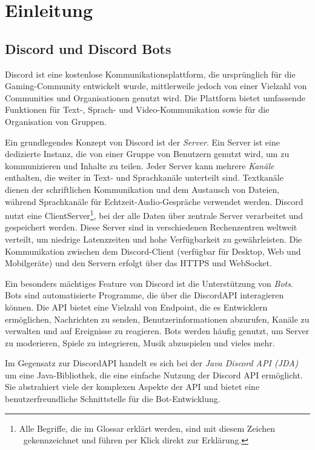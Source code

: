 
\section{Einleitung}\label{einleitung}

\subsection{Discord und Discord Bots}\label{discord-und-discord-bots}
Discord ist eine kostenlose Kommunikationsplattform, die ursprünglich für die Gaming-Com\-mu\-ni\-ty entwickelt wurde, mittlerweile jedoch von einer Vielzahl von Communities und Organisationen genutzt wird. Die Plattform bietet umfassende Funktionen für Text-, Sprach- und Video-Kommunikation sowie für die Organisation von Gruppen.

Ein grundlegendes Konzept von Discord ist der \emph{Server}. Ein Server ist eine dedizierte Instanz, die von einer Gruppe von Benutzern genutzt wird, um zu kommunizieren und Inhalte zu teilen. Jeder Server kann mehrere \emph{Kanäle} enthalten, die weiter in Text- und Sprachkanäle unterteilt sind. Textkanäle dienen der schriftlichen Kommunikation und dem Austausch von Dateien, während Sprachkanäle für Echtzeit-Audio-Gespräche verwendet werden.\autocite{discord-guide} Discord nutzt eine \gls{ClientServer}\footnote{Alle Begriffe, die im Glossar erklärt werden, sind mit diesem Zeichen \large\adfrightarrowhead\footnotesize\ gekennzeichnet und führen per Klick direkt zur Erklärung.}, bei der alle Daten über zentrale Server verarbeitet und gespeichert werden. Diese Server sind in verschiedenen Rechenzentren weltweit verteilt, um niedrige Latenzzeiten und hohe Verfügbarkeit zu gewährleisten. Die Kommunikation zwischen dem Discord-Client (verfügbar für Desktop, Web und Mobilgeräte) und den Servern erfolgt über das \gls{HTTPS} und \gls{WebSocket}.\autocite{discord-developer}

Ein besonders mächtiges Feature von Discord ist die Unterstützung von \emph{Bots}. Bots sind automatisierte Programme, die über die \gls{DiscordAPI} interagieren können. Die API bietet eine Vielzahl von \gls{Endpoint}, die es Entwicklern ermöglichen, Nachrichten zu senden, Benutzerinformationen abzurufen, Kanäle zu verwalten und auf Ereignisse zu reagieren. Bots werden häufig genutzt, um Server zu moderieren, Spiele zu integrieren, Musik abzuspielen und vieles mehr.

Im Gegensatz zur \gls{DiscordAPI} handelt es sich bei der \emph{Java Discord API (JDA)} um eine Java-Bibliothek, die eine einfache Nutzung der Discord API ermöglicht. Sie abstrahiert viele der komplexen Aspekte der API und bietet eine benutzerfreundliche Schnittstelle für die Bot-Entwicklung.

